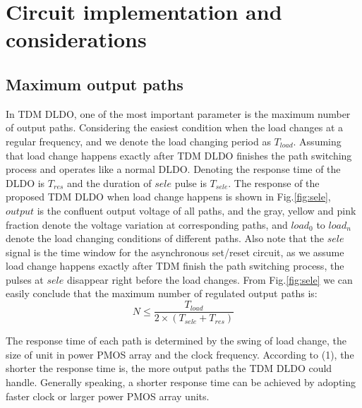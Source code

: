\documentclass[journal]{IEEEtran}
\begin{document}
\section{Circuit implementation and considerations}
\subsection{Maximum output paths}
In TDM DLDO, one of the most important parameter is the maximum number of output paths. Considering the easiest condition when the load changes at a regular frequency, and we denote the load changing period as $T_{load}$. Assuming that load change happens exactly after TDM DLDO finishes the path switching process and operates like a normal DLDO. Denoting the response time of the DLDO is $T_{res}$ and the duration of $sele$ pulse is $T_{sele}$. The response of the proposed TDM DLDO when load change happens is shown in Fig.\ref{fig:sele}, $output$ is the confluent output voltage of all paths, and the gray, yellow and pink fraction denote the voltage variation at corresponding paths, and $load_0$ to $load_n$ denote the load changing conditions of different paths. Also note that the $sele$ signal is the time window for the asynchronous set/reset circuit, as we assume load change happens exactly after TDM finish the path switching process, the pulses at $sele$ disappear right before the load changes. From Fig.\ref{fig:sele} we can easily conclude that the maximum number of regulated output paths is:
\begin{equation}
 N \leqslant \frac{T_{load}}{2\times(T_{sele}+T_{res})}
\end{equation}

The response time of each path is determined by the swing of load change, the size of unit in power PMOS array and the clock frequency. According to (1), the shorter the response time is, the more output paths the TDM DLDO could handle. Generally speaking, a shorter response time can be achieved by adopting faster clock or larger power PMOS array units.
\end{document}
